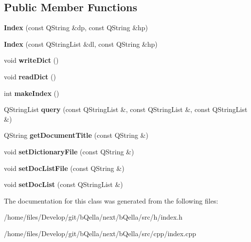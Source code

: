 \subsection*{Public Member Functions}
\begin{DoxyCompactItemize}
\item 
\hypertarget{classIndex_a92acd34e9d9082cd92adfd71b95c4e33}{
{\bfseries Index} (const QString \&dp, const QString \&hp)}
\label{classIndex_a92acd34e9d9082cd92adfd71b95c4e33}

\item 
\hypertarget{classIndex_a021dd299446ef58a9e6c9677a586879d}{
{\bfseries Index} (const QStringList \&dl, const QString \&hp)}
\label{classIndex_a021dd299446ef58a9e6c9677a586879d}

\item 
\hypertarget{classIndex_a078b5092bc0c7bf42ef5156f7ef3b3e9}{
void {\bfseries writeDict} ()}
\label{classIndex_a078b5092bc0c7bf42ef5156f7ef3b3e9}

\item 
\hypertarget{classIndex_ac871e9464202d8fe42fb210f3a117a58}{
void {\bfseries readDict} ()}
\label{classIndex_ac871e9464202d8fe42fb210f3a117a58}

\item 
\hypertarget{classIndex_a43053ab8ab104e4ca8ba318856953f8e}{
int {\bfseries makeIndex} ()}
\label{classIndex_a43053ab8ab104e4ca8ba318856953f8e}

\item 
\hypertarget{classIndex_a2a4589991f92e44ea09bade9da1221f5}{
QStringList {\bfseries query} (const QStringList \&, const QStringList \&, const QStringList \&)}
\label{classIndex_a2a4589991f92e44ea09bade9da1221f5}

\item 
\hypertarget{classIndex_a95409361210136424146ac7741a4c109}{
QString {\bfseries getDocumentTitle} (const QString \&)}
\label{classIndex_a95409361210136424146ac7741a4c109}

\item 
\hypertarget{classIndex_a0cedbd2160c73072b531eea25e0749de}{
void {\bfseries setDictionaryFile} (const QString \&)}
\label{classIndex_a0cedbd2160c73072b531eea25e0749de}

\item 
\hypertarget{classIndex_a57c380785262218c10126924a1cc2ef7}{
void {\bfseries setDocListFile} (const QString \&)}
\label{classIndex_a57c380785262218c10126924a1cc2ef7}

\item 
\hypertarget{classIndex_a948f8692b7a74ef9fdb716033d82bfea}{
void {\bfseries setDocList} (const QStringList \&)}
\label{classIndex_a948f8692b7a74ef9fdb716033d82bfea}

\end{DoxyCompactItemize}


The documentation for this class was generated from the following files:\begin{DoxyCompactItemize}
\item 
/home/files/Develop/git/bQella/next/bQella/src/h/index.h\item 
/home/files/Develop/git/bQella/next/bQella/src/cpp/index.cpp\end{DoxyCompactItemize}
